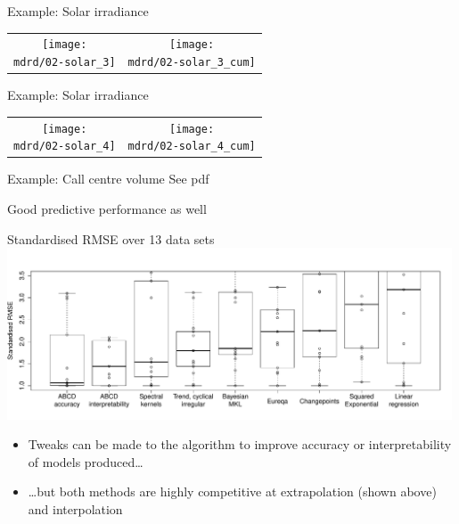 \begin{frame}{Example: Solar irradiance}
\newcommand{\wmgd}{0.5\columnwidth}
\newcommand{\hmgd}{3.0cm}
\newcommand{\mdrd}{figures/02-solar}
\newcommand{\mbm}{\hspace{-0.3cm}}
{\footnotesize

}

\vspace{\baselineskip}

\begin{tabular}{cc}
\mbm \texttt{[image: \\mdrd/02-solar\_3]} & \texttt{[image: \\mdrd/02-solar\_3\_cum]}
\end{tabular}
\end{frame}

\begin{frame}{Example: Solar irradiance}
\newcommand{\wmgd}{0.5\columnwidth}
\newcommand{\hmgd}{3.0cm}
\newcommand{\mdrd}{figures/02-solar}
\newcommand{\mbm}{\hspace{-0.3cm}}
{\footnotesize

}

\vspace{\baselineskip}

\begin{tabular}{cc}
\mbm \texttt{[image: \\mdrd/02-solar\_4]} & \texttt{[image: \\mdrd/02-solar\_4\_cum]}
\end{tabular}
\end{frame}

\begin{frame}{Example: Call centre volume}
  See pdf
\end{frame}

\begin{frame}{Good predictive performance as well}
  \begin{block}{Standardised RMSE over 13 data sets}
  \includegraphics[width=0.99\textwidth]{figures/box_extrap_wide}\\
  \begin{itemize}
    \item Tweaks can be made to the algorithm to improve accuracy or interpretability of models produced\ldots
    \vspace{\baselineskip}
    \item \ldots but both methods are highly competitive at extrapolation (shown above) and interpolation
  \end{itemize}
  \end{block}
\end{frame}

